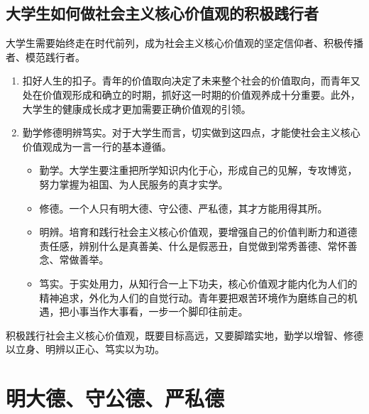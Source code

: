 \subsection{大学生如何做社会主义核心价值观的积极践行者}
大学生需要始终走在时代前列，成为社会主义核心价值观的坚定信仰者、积极传播者、模范践行者。
\begin{enumerate}
\item 扣好人生的扣子。青年的价值取向决定了未来整个社会的价值取向，而青年又处在价值观形成和确立的时期，抓好这一时期的价值观养成十分重要。此外，大学生的健康成长成才更加需要正确价值观的引领。
\item 勤学修德明辨笃实。对于大学生而言，切实做到这四点，才能使社会主义核心价值观成为一言一行的基本遵循。
\begin{itemize}
\item 勤学。大学生要注重把所学知识内化于心，形成自己的见解，专攻博览，努力掌握为祖国、为人民服务的真才实学。
\item 修德。一个人只有明大德、守公德、严私德，其才方能用得其所。
\item 明辨。培育和践行社会主义核心价值观，要增强自己的价值判断力和道德责任感，辨别什么是真善美、什么是假恶丑，自觉做到常秀善德、常怀善念、常做善举。
\item 笃实。于实处用力，从知行合一上下功夫，核心价值观才能内化为人们的精神追求，外化为人们的自觉行动。青年要把艰苦环境作为磨练自己的机遇，把小事当作大事看，一步一个脚印往前走。
\end{itemize}
\end{enumerate}

积极践行社会主义核心价值观，既要目标高远，又要脚踏实地，勤学以增智、修德以立身、明辨以正心、笃实以为功。

\section{明大德、守公德、严私德}
